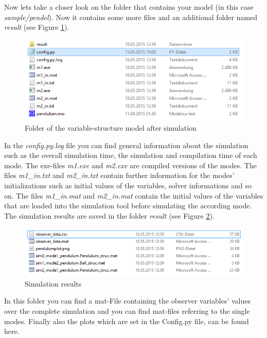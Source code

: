 Now lets take a closer look on the folder that contains your model (in this case  \textit{sample/pendel}). Now it contains some more files and an additional folder named \textit{result} (see Figure \ref{fig:modelfolder}).

 \begin{figure}[htb]
 \centering
 \includegraphics[width=1.0\textwidth,angle=0]{images/GettingStarted/modelfolder}
 \caption[Folder of the variable-structure model after simulation]{Folder of the variable-structure model after simulation}
 \label{fig:modelfolder}
\end{figure}

In the \textit{config.py.log} file you can find general information about the simulation such as the overall simulation time, the simulation and compilation time of each mode. The exe-files \textit{m1.exe} and \textit{m2.exe} are compiled versions of the modes. The files \textit{m1\_in.txt} and \textit{m2\_in.txt} contain further information for the modes' initializations such as initial values of the variables, solver informations and so on. The files  \textit{m1\_in.mat} and \textit{m2\_in.mat} contain the initial values of the variables that are loaded into the simulation tool before simulating the according mode. The simulation results are saved in the folder \textit{result} (see Figure \ref{fig:result}).

 \begin{figure}[htb]
 \centering
 \includegraphics[width=1.0\textwidth,angle=0]{images/GettingStarted/resultfolder}
 \caption[Simulation results]{Simulation results}
 \label{fig:result}
\end{figure}

In this folder you can find a mat-File containing the observer variables' values over the complete simulation and you can find mat-files referring to the single modes. Finally also the plots which are set in the Config.py file, can be found here.
